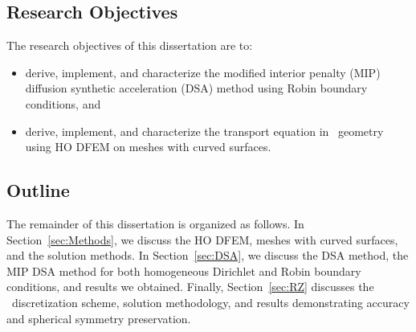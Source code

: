\documentclass{article}
\begin{document}
\subsection{Research Objectives}
\label{sec:ResearchObjectivesIntro}
The research objectives of this dissertation are to:
\begin{itemize}
\item{derive, implement, and characterize the modified interior penalty (MIP) diffusion synthetic acceleration (DSA) method using Robin boundary conditions, and}
\item{derive, implement, and characterize the transport equation in \RZ\ geometry using HO DFEM on meshes with curved surfaces.}
\end{itemize}

\subsection{Outline}
\label{sec:OutlineIntro}
The remainder of this dissertation is organized as follows. In Section~\ref{sec:Methods}, we discuss the HO DFEM, meshes with curved surfaces, and the solution methods. In Section~\ref{sec:DSA}, we discuss the DSA method, the MIP DSA method for both homogeneous Dirichlet and Robin boundary conditions, and results we obtained. Finally, Section~\ref{sec:RZ} discusses the \RZ\ discretization scheme, solution methodology, and results demonstrating accuracy and spherical symmetry preservation.

%
%
\end{document}

